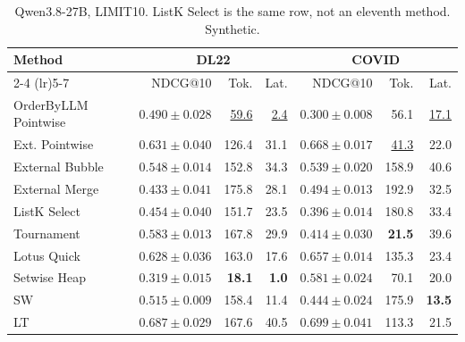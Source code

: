 \begin{table}[t]
\centering\footnotesize\setlength{\tabcolsep}{3.2pt}\renewcommand{\arraystretch}{1.12}
\caption{Qwen3.8-27B, LIMIT10. ListK Select is the same row, not an eleventh method. Synthetic.}
\begin{tabular}{@{}lrrrrrr@{}}
\toprule
Method & \multicolumn{3}{c}{DL22} & \multicolumn{3}{c}{COVID} \\
\cmidrule(lr){2-4} \cmidrule(lr){5-7}
 & NDCG@10 & Tok. & Lat. & NDCG@10 & Tok. & Lat. \\
\midrule
OrderByLLM Pointwise & $0.490\pm0.028$ & \underline{59.6} & \underline{2.4} & $0.300\pm0.008$ & 56.1 & \underline{17.1} \\
Ext. Pointwise & \underline{$0.631\pm0.040$} & 126.4 & 31.1 & \underline{$0.668\pm0.017$} & \underline{41.3} & 22.0 \\
External Bubble & $0.548\pm0.014$ & 152.8 & 34.3 & $0.539\pm0.020$ & 158.9 & 40.6 \\
External Merge & $0.433\pm0.041$ & 175.8 & 28.1 & $0.494\pm0.013$ & 192.9 & 32.5 \\
ListK Select & $0.454\pm0.040$ & 151.7 & 23.5 & $0.396\pm0.014$ & 180.8 & 33.4 \\
Tournament & $0.583\pm0.013$ & 167.8 & 29.9 & $0.414\pm0.030$ & \textbf{21.5} & 39.6 \\
Lotus Quick & $0.628\pm0.036$ & 163.0 & 17.6 & $0.657\pm0.014$ & 135.3 & 23.4 \\
Setwise Heap & $0.319\pm0.015$ & \textbf{18.1} & \textbf{1.0} & $0.581\pm0.024$ & 70.1 & 20.0 \\
SW & $0.515\pm0.009$ & 158.4 & 11.4 & $0.444\pm0.024$ & 175.9 & \textbf{13.5} \\
LT & \textbf{$0.687\pm0.029$} & 167.6 & 40.5 & \textbf{$0.699\pm0.041$} & 113.3 & 21.5 \\
\bottomrule
\end{tabular}
\end{table}

